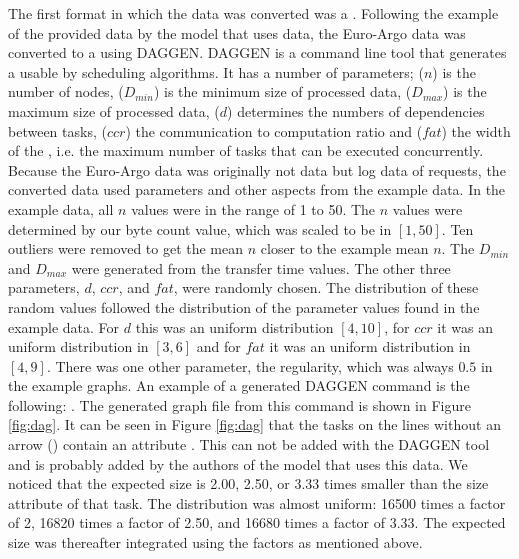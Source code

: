 The first format in which the data was converted was a \DAG. Following the
example of the provided data by the model that uses \DAG data\footnotemark,
the Euro-Argo data was converted to a \DAG using
DAGGEN. DAGGEN is a command line tool that
generates a \DAG usable by scheduling algorithms. It has a number of
parameters;  ($n$) is the number of nodes,  ($D_{min}$)
is the minimum size of processed data,  ($D_{max}$) is the
maximum size of processed data,  ($d$) determines the numbers of
dependencies between tasks,  ($ccr$) the communication to
computation ratio and  ($fat$) the width of the \DAG, i.e. the
maximum number of tasks that can be executed concurrently. Because the
Euro-Argo data was originally not \jss data but log data of requests, the
converted data used parameters and other aspects from the example data. In the
example data, all $n$ values were in the range of 1 to 50. The $n$ values were
determined by our byte count value, which was scaled to be in $[1, 50]$. Ten
outliers were removed to get the mean $n$ closer to the example mean $n$. The
$D_{min}$ and $D_{max}$ were generated from the transfer time values. The
other three parameters, $d$, $ccr$, and $fat$, were randomly chosen. The
distribution of these random values followed the distribution of the parameter
values found in the example data. For $d$ this was an uniform distribution
$[4, 10]$, for $ccr$ it was an uniform distribution in $[3, 6]$ and for $fat$
it was an uniform distribution in $[4, 9]$. There was one other parameter, the
regularity, which was always $0.5$ in the example graphs. An example of a
generated DAGGEN command is the following: . The generated graph file from this
command is shown in Figure \ref{fig:dag}. It can be seen in Figure \ref{fig:dag}
that the tasks on the lines without an arrow (\code{->}) contain an attribute
. This can not be added with the DAGGEN tool and is
probably added by the authors of the model that uses this data. We noticed
that the expected size is 2.00, 2.50, or 3.33 times smaller than the size
attribute of that task. The distribution was almost uniform: 16500 times a
factor of 2, 16820 times a factor of 2.50, and 16680 times a factor of 3.33.
The expected size was thereafter integrated using the factors as mentioned
above.


